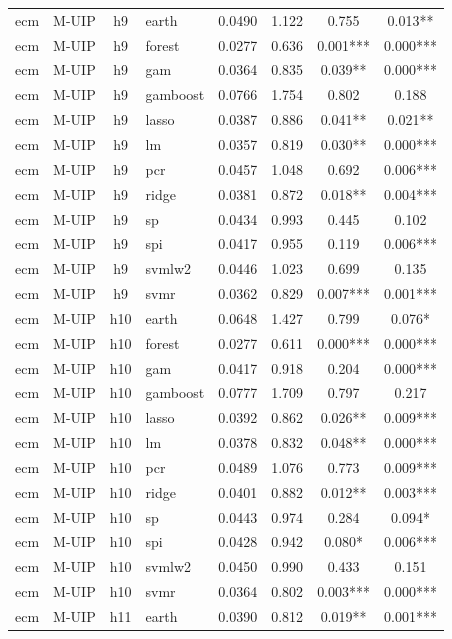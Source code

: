 \begin{ThreePartTable}
\begin{longtable}[t]{llclcccc}
ecm & M-UIP & h9 & earth & 0.0490 & 1.122 & 0.755 & 0.013**\\
ecm & M-UIP & h9 & forest & 0.0277 & 0.636 & 0.001*** & 0.000***\\
ecm & M-UIP & h9 & gam & 0.0364 & 0.835 & 0.039** & 0.000***\\
ecm & M-UIP & h9 & gamboost & 0.0766 & 1.754 & 0.802 & 0.188\\
ecm & M-UIP & h9 & lasso & 0.0387 & 0.886 & 0.041** & 0.021**\\
ecm & M-UIP & h9 & lm & 0.0357 & 0.819 & 0.030** & 0.000***\\
ecm & M-UIP & h9 & pcr & 0.0457 & 1.048 & 0.692 & 0.006***\\
ecm & M-UIP & h9 & ridge & 0.0381 & 0.872 & 0.018** & 0.004***\\
ecm & M-UIP & h9 & sp & 0.0434 & 0.993 & 0.445 & 0.102\\
ecm & M-UIP & h9 & spi & 0.0417 & 0.955 & 0.119 & 0.006***\\
ecm & M-UIP & h9 & svmlw2 & 0.0446 & 1.023 & 0.699 & 0.135\\
ecm & M-UIP & h9 & svmr & 0.0362 & 0.829 & 0.007*** & 0.001***\\
\addlinespace
ecm & M-UIP & h10 & earth & 0.0648 & 1.427 & 0.799 & 0.076*\\
ecm & M-UIP & h10 & forest & 0.0277 & 0.611 & 0.000*** & 0.000***\\
ecm & M-UIP & h10 & gam & 0.0417 & 0.918 & 0.204 & 0.000***\\
ecm & M-UIP & h10 & gamboost & 0.0777 & 1.709 & 0.797 & 0.217\\
ecm & M-UIP & h10 & lasso & 0.0392 & 0.862 & 0.026** & 0.009***\\
ecm & M-UIP & h10 & lm & 0.0378 & 0.832 & 0.048** & 0.000***\\
ecm & M-UIP & h10 & pcr & 0.0489 & 1.076 & 0.773 & 0.009***\\
ecm & M-UIP & h10 & ridge & 0.0401 & 0.882 & 0.012** & 0.003***\\
ecm & M-UIP & h10 & sp & 0.0443 & 0.974 & 0.284 & 0.094*\\
ecm & M-UIP & h10 & spi & 0.0428 & 0.942 & 0.080* & 0.006***\\
ecm & M-UIP & h10 & svmlw2 & 0.0450 & 0.990 & 0.433 & 0.151\\
ecm & M-UIP & h10 & svmr & 0.0364 & 0.802 & 0.003*** & 0.000***\\
\addlinespace
ecm & M-UIP & h11 & earth & 0.0390 & 0.812 & 0.019** & 0.001***\\

\end{longtable}
\end{ThreePartTable}
